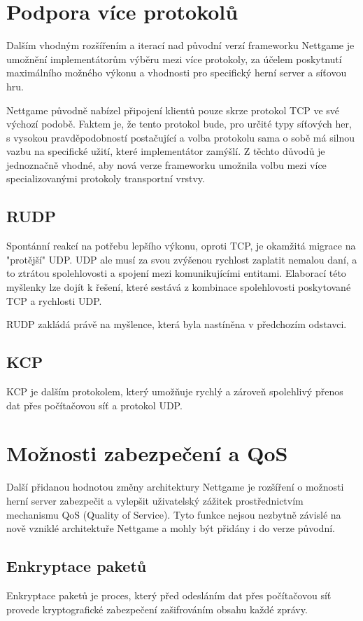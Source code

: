 \documentclass{article}
\begin{document}
\newpage
\section{Podpora více protokolů}
Dalším vhodným rozšířením a iterací nad původní verzí frameworku Nettgame je umožnění implementátorům výběru mezi více protokoly, za účelem poskytnutí maximálního možného výkonu a vhodnosti pro specifický herní server a síťovou hru.

Nettgame původně nabízel připojení klientů pouze skrze protokol TCP ve své výchozí podobě. Faktem je, že tento protokol bude, pro určité typy síťových her, s vysokou pravděpodobností postačující a volba protokolu sama o sobě má silnou vazbu na specifické užití, které implementátor zamýšlí. Z těchto důvodů je jednoznačně vhodné, aby nová verze frameworku umožnila volbu mezi více specializovanými protokoly transportní vrstvy.
\subsection{RUDP}
Spontánní reakcí na potřebu lepšího výkonu, oproti TCP, je okamžitá migrace na "protější" UDP. UDP ale musí za svou zvýšenou rychlost zaplatit nemalou daní, a to ztrátou spolehlovosti a spojení mezi komunikujícími entitami. Elaborací této myšlenky lze dojít k řešení, které sestává z kombinace spolehlovosti poskytované TCP a rychlosti UDP.

RUDP zakládá právě na myšlence, která byla nastíněna v předchozím odstavci.
\subsection{KCP}

KCP je dalším protokolem, který umožňuje rychlý a zároveň spolehlivý přenos dat přes počítačovou síť a protokol UDP.

\newpage
\section{Možnosti zabezpečení a QoS}
Další přidanou hodnotou změny architektury Nettgame je rozšíření o možnosti herní server zabezpečit a vylepšit uživatelský zážitek prostřednictvím mechanismu QoS (Quality of Service). Tyto funkce nejsou nezbytně závislé na nově vzniklé architektuře Nettgame a mohly být přidány i do verze původní.
\subsection{Enkryptace paketů}
Enkryptace paketů je proces, který před odesláním dat přes počítačovou síť provede kryptografické zabezpečení zašifrováním obsahu každé zprávy.
\end{document}

